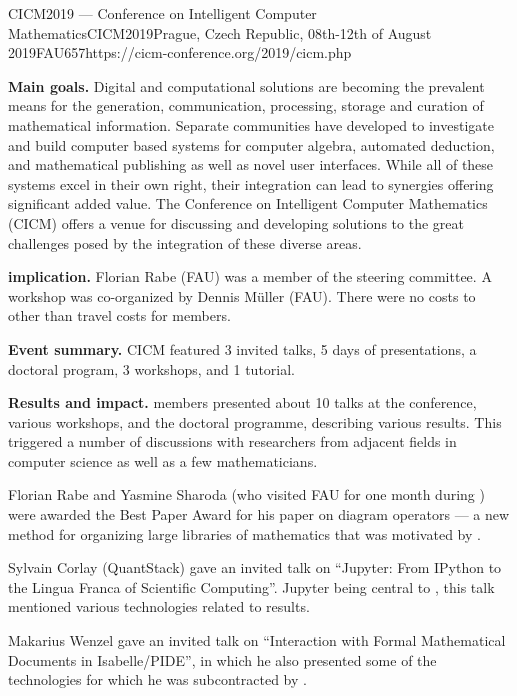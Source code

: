 \begin{event}{CICM2019 --- Conference on Intelligent Computer Mathematics}{CICM2019}{Prague, Czech Republic, 08th-12th of August 2019}{FAU}{65}{7}{https://cicm-conference.org/2019/cicm.php}

\textbf{Main goals.}
Digital and computational solutions are becoming the prevalent means for the generation, communication, processing, storage and curation of mathematical information.
Separate communities have developed to investigate and build computer based systems for computer algebra, automated deduction, and mathematical publishing as well as novel user interfaces.
While all of these systems excel in their own right, their integration can lead to synergies offering significant added value.
The Conference on Intelligent Computer Mathematics (CICM) offers a venue for discussing and developing solutions to the great challenges posed by the integration of these diverse areas.

\textbf{\ODK implication.}
Florian Rabe (FAU) was a member of the steering committee.
A workshop was co-organized by Dennis M\"uller (FAU).
There were no costs to \ODK other than travel costs for \ODK members.

\textbf{Event summary.}
CICM featured 3 invited talks, 5 days of presentations, a doctoral program, 3 workshops, and 1 tutorial.

\textbf{Results and impact.}
\ODK members presented about 10 talks at the conference, various workshops, and the doctoral programme, describing various \ODK results.
This triggered a number of discussions with researchers from adjacent fields in computer science as well as a few mathematicians.

Florian Rabe and Yasmine Sharoda (who visited FAU for one month during \ODK) were awarded the Best Paper Award for his paper on diagram operators --- a new method for organizing large libraries of mathematics that was motivated by \ODK.

Sylvain Corlay (QuantStack) gave an invited talk on ``Jupyter: From IPython to the Lingua Franca of Scientific Computing''.
Jupyter being central to \ODK, this talk mentioned various technologies related to \ODK results.

Makarius Wenzel gave an invited talk on ``Interaction with Formal Mathematical Documents in Isabelle/PIDE'', in which he also presented some of the technologies for which he was subcontracted by \ODK.
\end{event}
